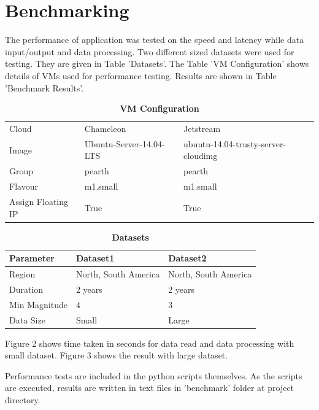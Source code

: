 \documentclass[9pt,twocolumn,twoside]{../../styles/osajnl}
\begin{document}
\section{Benchmarking}

The performance of application was tested on the speed and latency while data input/output and data processing. Two different sized datasets were used for testing. They are given in Table 'Datasets'. The Table 'VM Configuration' shows details of VMs used for performance testing. Results are shown in Table 'Benchmark Results'.
 

\begin{table}[htbp]
  
\caption{\bf VM Configuration}
\begin{tabular}{ m{5em} m{2cm} m{2cm} } 
\hline
Cloud & Chameleon & Jetstream \\ 
Image & Ubuntu-Server-14.04-LTS & ubuntu-14.04-trusty-server-cloudimg \\ 
Group & pearth & pearth \\ 
Flavour & m1.small & m1.small \\ 
Assign Floating IP & True & True \\ 

\hline
\end{tabular}
\end{table} 

\begin{table}[htbp]
\caption{\bf Datasets}
\begin{tabular}{ m{5em} m{2cm} m{2cm} } 
\hline
Parameter & Dataset1 & Dataset2 \\ 
\hline
Region & North, South America & North, South America \\ 
Duration & 2 years & 2 years \\ 
Min Magnitude & 4 & 3 \\ 
Data Size & Small & Large \\ 

\hline
\end{tabular}
\end{table} 

Figure 2 shows time taken in seconds for data read and data processing with small dataset. Figure 3 shows the result with large dataset.

Performance tests are included in the python scripts themselves. As the scripts are executed, results are written in text files in 'benchmark' folder at project directory.
\end{document}
